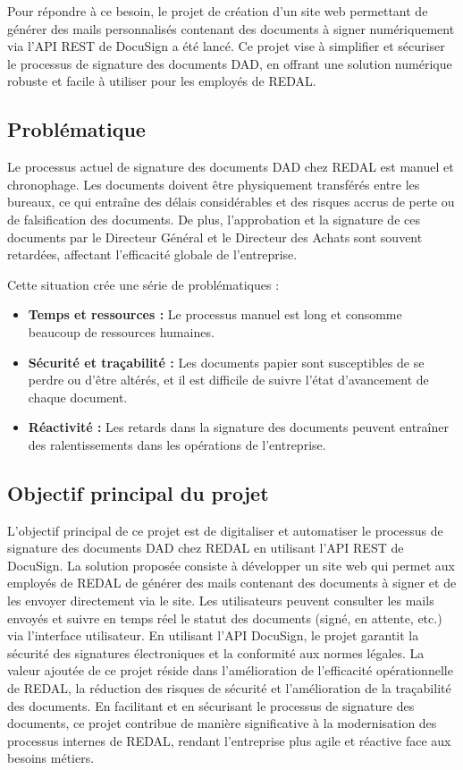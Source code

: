 Pour répondre à ce besoin, le projet de création d'un site web permettant de générer des mails personnalisés contenant des documents à signer numériquement via l'API REST de DocuSign a été lancé. Ce projet vise à simplifier et sécuriser le processus de signature des documents DAD, en offrant une solution numérique robuste et facile à utiliser pour les employés de REDAL.


\subsection{Problématique}
Le processus actuel de signature des documents DAD chez REDAL est manuel et chronophage. Les documents doivent être physiquement transférés entre les bureaux, ce qui entraîne des délais considérables et des risques accrus de perte ou de falsification des documents. De plus, l'approbation et la signature de ces documents par le Directeur Général et le Directeur des Achats sont souvent retardées, affectant l'efficacité globale de l'entreprise.

Cette situation crée une série de problématiques :

\begin{itemize}

    \item \textbf{Temps et ressources :}
Le processus manuel est long et consomme beaucoup de ressources humaines.

\item \textbf{Sécurité et traçabilité :}
Les documents papier sont susceptibles de se perdre ou d'être altérés, et il est difficile de suivre l'état d'avancement de chaque document.

\item \textbf{Réactivité :} 
Les retards dans la signature des documents peuvent entraîner des ralentissements dans les opérations de l'entreprise.

\end{itemize}
\subsection{Objectif principal du projet}
L'objectif principal de ce projet est de digitaliser et automatiser le processus de signature des documents DAD chez REDAL en utilisant l'API REST de DocuSign. La solution proposée consiste à développer un site web qui permet aux employés de REDAL de générer des mails contenant des documents à signer et de les envoyer directement via le site. Les utilisateurs peuvent consulter les mails envoyés et suivre en temps réel le statut des documents (signé, en attente, etc.) via l'interface utilisateur. En utilisant l'API DocuSign, le projet garantit la sécurité des signatures électroniques et la conformité aux normes légales. La valeur ajoutée de ce projet réside dans l'amélioration de l'efficacité opérationnelle de REDAL, la réduction des risques de sécurité et l'amélioration de la traçabilité des documents. En facilitant et en sécurisant le processus de signature des documents, ce projet contribue de manière significative à la modernisation des processus internes de REDAL, rendant l'entreprise plus agile et réactive face aux besoins métiers.


